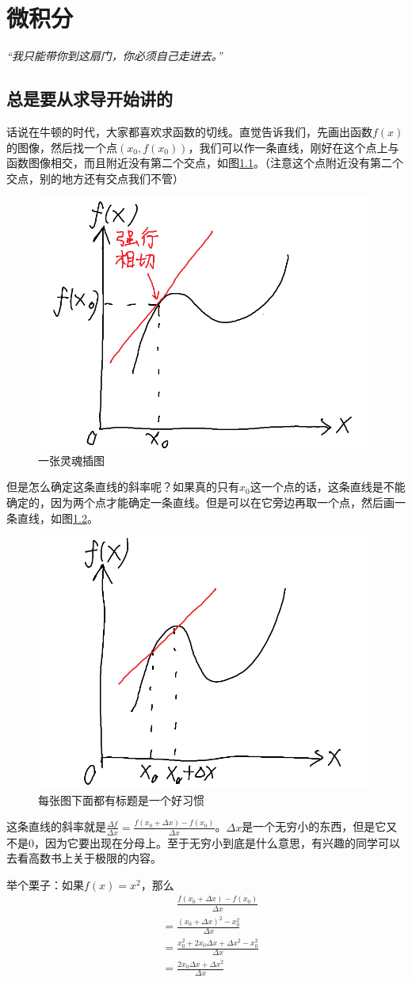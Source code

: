 \chapter{微积分}
\centerline{\it “我只能带你到这扇门，你必须自己走进去。”}
\section{总是要从求导开始讲的}
话说在牛顿的时代，大家都喜欢求函数的切线。直觉告诉我们，先画出函数$f(x)$的图像，然后找一个点$(x_0,f(x_0))$，我们可以作一条直线，刚好在这个点上与函数图像相交，而且附近没有第二个交点，如图\ref{fig-tangent}。（注意这个点附近没有第二个交点，别的地方还有交点我们不管）
\begin{figure}[htb]
\centering
\includegraphics[width=0.33\linewidth]{fig/tangent.png}
\caption{一张灵魂插图}
\label{fig-tangent}
\end{figure}

但是怎么确定这条直线的斜率呢？如果真的只有$x_0$这一个点的话，这条直线是不能确定的，因为两个点才能确定一条直线。但是可以在它旁边再取一个点，然后画一条直线，如图\ref{fig-secant}。
\begin{figure}[htb]
\centering
\includegraphics[width=0.33\linewidth]{fig/secant.png}
\caption{每张图下面都有标题是一个好习惯}
\label{fig-secant}
\end{figure}

这条直线的斜率就是$\frac{\Delta f}{\Delta x}=\frac{f(x_0+\Delta x)-f(x_0)}{\Delta x}$。$\Delta x$是一个无穷小的东西，但是它又不是$0$，因为它要出现在分母上。至于无穷小到底是什么意思，有兴趣的同学可以去看高数书上关于极限的内容。

举个栗子：如果$f(x)=x^2$，那么
\begin{align*}
&\mathrel{\phantom{=}}\frac{f(x_0+\Delta x)-f(x_0)}{\Delta x} \\
&=\frac{(x_0+\Delta x)^2-x_0^2}{\Delta x} \\
&=\frac{x_0^2+2 x_0 \Delta x+\Delta x^2-x_0^2}{\Delta x} \\
&=\frac{2 x_0 \Delta x+\Delta x^2}{\Delta x}
\end{align*}

